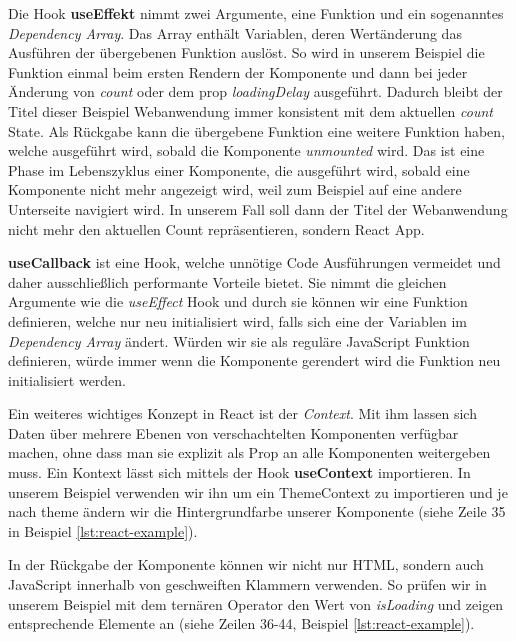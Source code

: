 \documentclass[a4paper,12pt]{report}
\begin{document}
Die Hook \textbf{useEffekt} nimmt zwei Argumente, eine Funktion und ein sogenanntes \textit{Dependency Array}. Das Array enthält Variablen, deren Wertänderung das Ausführen der übergebenen Funktion auslöst. So wird in unserem Beispiel die Funktion einmal beim ersten Rendern der Komponente und dann bei jeder Änderung von \textit{count} oder dem prop \textit{loadingDelay} ausgeführt. Dadurch bleibt der Titel dieser Beispiel Webanwendung immer konsistent mit dem aktuellen \textit{count} State. Als Rückgabe kann die übergebene Funktion eine weitere Funktion haben, welche ausgeführt wird, sobald die Komponente \textit{unmounted} wird. Das ist eine Phase im Lebenszyklus einer Komponente, die ausgeführt wird, sobald eine Komponente nicht mehr angezeigt wird, weil zum Beispiel auf eine andere Unterseite navigiert wird. In unserem Fall soll dann der Titel der Webanwendung nicht mehr den aktuellen Count repräsentieren, sondern \glqq React App\grqq .

\textbf{useCallback} ist eine Hook, welche unnötige Code Ausführungen vermeidet und daher ausschließlich performante Vorteile bietet. Sie nimmt die gleichen Argumente wie die \textit{useEffect} Hook und durch sie können wir eine Funktion definieren, welche nur neu initialisiert wird, falls sich eine der Variablen im \textit{Dependency Array} ändert. Würden wir sie als reguläre JavaScript Funktion definieren, würde immer wenn die Komponente gerendert wird die Funktion neu initialisiert werden.

Ein weiteres wichtiges Konzept in React ist der \textit{Context}. Mit ihm lassen sich Daten über mehrere Ebenen von verschachtelten Komponenten verfügbar machen, ohne dass man sie explizit als Prop an alle Komponenten weitergeben muss. Ein Kontext lässt sich mittels der Hook \textbf{useContext} importieren. In unserem Beispiel verwenden wir ihn um ein ThemeContext zu importieren und je nach theme ändern wir die Hintergrundfarbe unserer Komponente (siehe Zeile 35 in Beispiel \ref{lst:react-example}).

In der Rückgabe der Komponente können wir nicht nur HTML, sondern auch JavaScript innerhalb von geschweiften Klammern verwenden. So prüfen wir in unserem Beispiel mit dem ternären Operator den Wert von \textit{isLoading} und zeigen entsprechende Elemente an (siehe Zeilen 36-44, Beispiel \ref{lst:react-example}).
\end{document}
